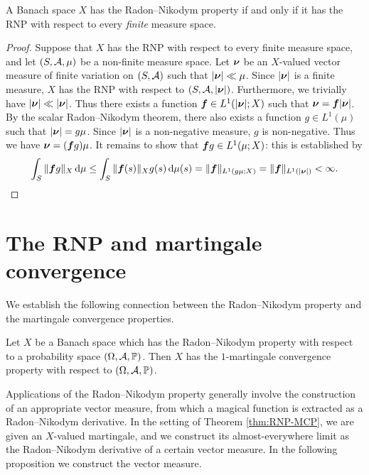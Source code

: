 \begin{prop}\label{prop:RNP-finite-sufficient}
  A Banach space $X$ has the Radon--Nikodym property if and only if it has the RNP with respect to every \emph{finite} measure space.
\end{prop}

\begin{proof}
  Suppose that $X$ has the RNP with respect to every finite measure space, and let $(S,\mathcal{A},\mu)$ be a non-finite measure space.
  Let $\bm{\nu}$ be an $X$-valued vector measure of finite variation on $(S,\mathcal{A})$ such that $|\bm{\nu}| \ll \mu$.
  Since $|\bm{\nu}|$ is a finite measure, $X$ has the RNP with respect to $(S,\mathcal{A},|\bm{\nu}|)$.
  Furthermore, we trivially have $|\bm{\nu}| \ll |\bm{\nu}|$.
  Thus there exists a function $\bm{f} \in L^1(|\bm{\nu}|;X)$ such that $\bm{\nu} = \bm{f}|\bm{\nu}|$.
  By the scalar Radon--Nikodym theorem, there also exists a function $g \in L^1(\mu)$ such that $|\bm{\nu}| = g\mu$.
  Since $|\bm{\nu}|$ is a non-negative measure, $g$ is non-negative.
  Thus we have $\bm{\nu} = (\bm{f}g)\mu$.
  It remains to show that $\bm{f}g \in L^1(\mu;X)$: this is established by
  \begin{equation*}
    \int_{S} \|\bm{f}g\|_{X} \, \mathrm{d}\mu
    \leq \int_{S} \|\bm{f}(s)\|_{X} g(s) \, \mathrm{d}\mu(s) = \|\bm{f}\|_{L^1(g\mu;X)} = \|\bm{f}\|_{L^1(|\bm{\nu}|)} < \infty. 
  \end{equation*}
\end{proof}

\section{The RNP and martingale convergence}

We establish the following connection between the Radon--Nikodym property and the martingale convergence properties.

\begin{thm}\label{thm:RNP-MCP}
  Let $X$ be a Banach space which has the Radon--Nikodym property with respect to a probability space $(\Omega,\mathcal{A},\mathbb{P})$.
  Then $X$ has the $1$-martingale convergence property with respect to $(\Omega,\mathcal{A},\mathbb{P})$.
\end{thm}

Applications of the Radon--Nikodym property generally involve the construction of an appropriate vector measure, from which a magical function is extracted as a Radon--Nikodym derivative.
In the setting of Theorem \ref{thm:RNP-MCP}, we are given an $X$-valued martingale, and we construct its almost-everywhere limit as the Radon--Nikodym derivative of a certain vector measure.
In the following proposition we construct the vector measure.


